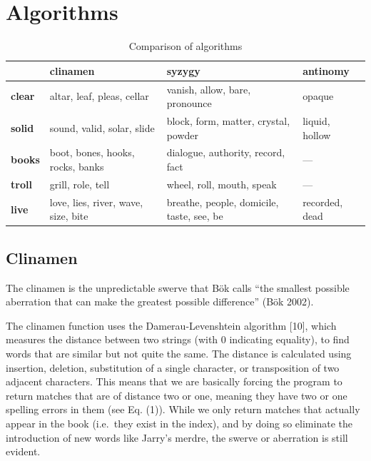 \section{Algorithms}

\begin{table}[htb]
  \begin{tabu}{X[1]|X[3]X[3]X[2]}
  \toprule
  &
  \textbf{clinamen}
  &
  \textbf{syzygy}
  &
  \textbf{antinomy}
  \\ \midrule
  \textbf{clear}
  &
  altar, leaf, pleas, cellar
  &
  vanish, allow, bare, pronounce
  &
  opaque
  \\ \midrule
  \textbf{solid}
  &
  sound, valid, solar, slide
  &
  block, form, matter, crystal, powder
  &
  liquid, hollow
  \\ \midrule
  \textbf{books}
  &
  boot, bones, hooks, rocks, banks
  &
  dialogue, authority, record, fact
  &
  ---
  \\ \midrule
  \textbf{troll}
  &
  grill, role, tell
  &
  wheel, roll, mouth, speak
  &
  ---
  \\ \midrule
  \textbf{live}
  &
  love, lies, river, wave, size, bite
  &
  breathe, people, domicile, taste, see, be
  &
  recorded, dead
  \\ \bottomrule
  \end{tabu}
\caption[Comparison of algorithms]{Comparison of algorithms}
\label{algorithmscomp}
\end{table}

\subsection{Clinamen}

The clinamen is the unpredictable swerve that Bök calls ``the smallest possible aberration that can make the greatest possible difference'' (Bök 2002).

The clinamen function uses the Damerau-Levenshtein algorithm [10], which measures the distance between two strings (with 0 indicating equality), to find words that are similar but not quite the same. The distance is calculated using insertion, deletion, substitution of a single character, or transposition of two adjacent characters. This means that we are basically forcing the program to return matches that are of distance two or one, meaning they have two or one spelling errors in them (see Eq. (1)). While we only return matches that actually appear in the book (i.e.\ they exist in the index), and by doing so eliminate the introduction of new words like Jarry's merdre, the swerve or aberration is still evident.

